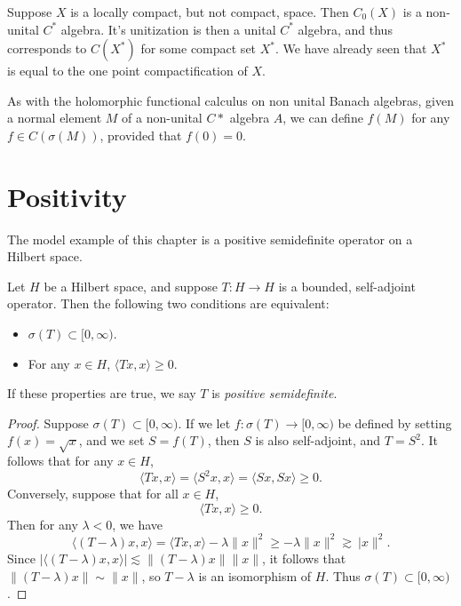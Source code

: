\begin{example}
    Suppose $X$ is a locally compact, but not compact, space. Then $C_0(X)$ is a non-unital $C^*$ algebra. It's unitization is then a unital $C^*$ algebra, and thus corresponds to $C(X^*)$ for some compact set $X^*$. We have already seen that $X^*$ is equal to the one point compactification of $X$.
\end{example}

As with the holomorphic functional calculus on non unital Banach algebras, given a normal element $M$ of a non-unital $C*$ algebra $A$, we can define $f(M)$ for any $f \in C(\sigma(M))$, provided that $f(0) = 0$.







\chapter{Positivity}

The model example of this chapter is a positive semidefinite operator on a Hilbert space.

\begin{theorem}
    Let $H$ be a Hilbert space, and suppose $T: H \to H$ is a bounded, self-adjoint operator. Then the following two conditions are equivalent:
    \begin{itemize}
        \item $\sigma(T) \subset [0,\infty)$.
        \item For any $x \in H$, $\langle Tx, x \rangle \geq 0$.
    \end{itemize}
    If these properties are true, we say $T$ is \emph{positive semidefinite}.
\end{theorem}
\begin{proof}
    Suppose $\sigma(T) \subset [0,\infty)$. If we let $f: \sigma(T) \to [0,\infty)$ be defined by setting $f(x) = \sqrt{x}$, and we set $S = f(T)$, then $S$ is also self-adjoint, and $T = S^2$. It follows that for any $x \in H$,
    \[ \langle Tx, x \rangle = \langle S^2x, x \rangle = \langle Sx, Sx \rangle \geq 0. \]
    Conversely, suppose that for all $x \in H$,
    \[ \langle Tx, x \rangle \geq 0. \]
    Then for any $\lambda < 0$, we have
    \[ \langle (T - \lambda)x, x \rangle = \langle Tx, x \rangle - \lambda \| x \|^2 \geq - \lambda \| x \|^2 \gtrsim \ |x \|^2. \]
    Since $| \langle (T - \lambda) x, x \rangle | \lesssim \| (T - \lambda) x \| \| x \|$, it follows that $\| (T - \lambda) x \| \sim \| x \|$, so $T - \lambda$ is an isomorphism of $H$. Thus $\sigma(T) \subset [0,\infty)$.
\end{proof}


